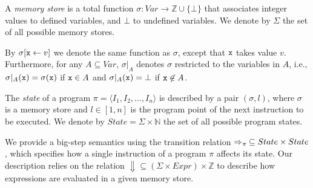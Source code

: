 \begin{definition}
A {\em memory store} is a total function $\sigma:Var\rightarrow \mathbb{Z}\cup\{\bot\}$ that associates integer values to defined variables, and $\bot$ to undefined variables. We denote by $\Sigma$ the set of all possible memory stores. 
\end{definition}

\noindent By $\sigma[\text{${\tt x}$}\gets v]$ we denote the same function as $\sigma$, except that $\text{${\tt x}$}$ takes value $v$. Furthermore, for any $A\subseteq Var$, $\sigma\vert_{A}$ denotes $\sigma$ restricted to the variables in $A$, i.e., $\sigma\vert_{A}(\text{${\tt x}$})=\sigma(\texttt{x})$ if $\text{${\tt x}$}\in A$ and $\sigma\vert_{A}(\text{${\tt x}$})=\bot$ if $\text{${\tt x}$}\not\in A$. 

\begin{definition}
\label{de:prog-state}
The {\em state} of a program $\pi=\langle I_1, I_2, \ldots, I_n \rangle$ is described by a pair $(\sigma,l)$, where $\sigma$ is a memory store and $l\in [1,n]$ is the program point of the next instruction to be executed. We denote by $State=\Sigma\times \mathbb{N}$ the set of all possible program states.
\end{definition}

\noindent We provide a big-step semantics using the transition relation $\Rightarrow_{\pi}\:\subseteq State\times State$, which specifies how a single instruction of a program $\pi$ affects its state. Our description relies on the relation $\Downarrow\subseteq(\Sigma\times Expr)\times \mathbb{Z}$ to describe how expressions are evaluated in a given memory store.


